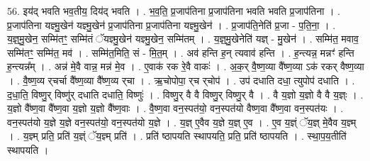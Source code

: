 \documentclass[17pt]{extarticle}
\begin{document}
56. इय॑द् भवति भव॒तीय॒ दिय॑द् भवति । . भ॒व॒ति॒ प्र॒जाप॑तिना प्र॒जाप॑तिना भवति भवति प्र॒जाप॑तिना । . प्र॒जाप॑तिना यज्ञ्मु॒खेन॑ यज्ञ्मु॒खेन॑ प्र॒जाप॑तिना प्र॒जाप॑तिना यज्ञ्मु॒खेन॑ । . प्र॒जाप॑ति॒नेति॑ प्र॒जा - प॒ति॒ना॒ । . य॒ज्ञ्॒मु॒खेन॒ सम्मि॑तꣳ॒॒ सम्मि॑तं ॅयज्ञ्मु॒खेन॑ यज्ञ्मु॒खेन॒ सम्मि॑तम् । . य॒ज्ञ्॒मु॒खेनेति॑ यज्ञ् - मु॒खेन॑ । . सम्मि॑त॒ मवाव॒ सम्मि॑तꣳ॒॒ सम्मि॑त॒ मव॑ । . सम्मि॑त॒मिति॒ सं - मि॒त॒म् । . अव॑ हन्ति ह॒न् त्यवाव॑ हन्ति । . ह॒न्त्यन्न॒ मन्नꣳ॑ हन्ति ह॒न्त्यन्न᳚म् । . अन्न॑ मे॒वै वान्न॒ मन्न॑ मे॒व । . ए॒वाक॑ रक रे॒वै वाकः॑ । . अ॒क॒र् वै॒ष्ण॒व्या वै᳚ष्ण॒व्या ऽक॑ रकर् वैष्ण॒व्या । . वै॒ष्ण॒व्य र्‌चर्चा वै᳚ष्ण॒व्या वै᳚ष्ण॒व्य र्‌चा । . ऋ॒चोपोपा॒ र्‌च र्‌चोप॑ । . उप॑ दधाति दधा॒ त्युपोप॑ दधाति । . द॒धा॒ति॒ विष्णु॒र् विष्णु॑र् दधाति दधाति॒ विष्णुः॑ । . विष्णु॒र् वै वै विष्णु॒र् विष्णु॒र् वै । . वै य॒ज्ञो य॒ज्ञो वै वै य॒ज्ञ्ः । . य॒ज्ञो वै᳚ष्ण॒वा वै᳚ष्ण॒वा य॒ज्ञो य॒ज्ञो वै᳚ष्ण॒वाः । . वै॒ष्ण॒वा वन॒स्पत॑यो॒ वन॒स्पत॑यो वैष्ण॒वा वै᳚ष्ण॒वा वन॒स्पत॑यः । . वन॒स्पत॑यो य॒ज्ञे य॒ज्ञे वन॒स्पत॑यो॒ वन॒स्पत॑यो य॒ज्ञे । . य॒ज्ञ् ए॒वैव य॒ज्ञे य॒ज्ञ् ए॒व । . ए॒व य॒ज्ञ्ं ॅय॒ज्ञ् मे॒वैव य॒ज्ञ्म् । . य॒ज्ञ्म् प्रति॒ प्रति॑ य॒ज्ञ्ं ॅय॒ज्ञ्म् प्रति॑ । . प्रति॑ ष्ठापयति स्थापयति॒ प्रति॒ प्रति॑ ष्ठापयति । . स्था॒प॒य॒तीति॑ स्थापयति । \newline
\end{document}
